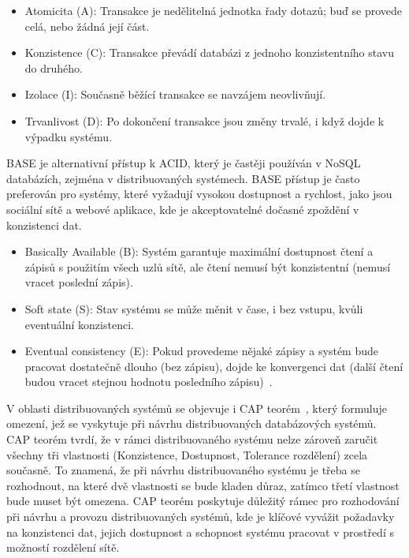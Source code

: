 \documentclass[czech,master,dept460,male,csharp,cpdeclaration]{diploma}
\begin{document}
	\begin{itemize}
		\item Atomicita (A): Transakce je nedělitelná jednotka řady dotazů; buď se provede celá, nebo žádná její část.
		\item Konzistence (C): Transakce převádí databázi z jednoho konzistentního stavu do druhého.
		\item Izolace (I): Současně běžící transakce se navzájem neovlivňují.
		\item Trvanlivost (D): Po dokončení transakce jsou změny trvalé, i když dojde k výpadku systému.
	\end{itemize}
	
	BASE je alternativní přístup k ACID, který je častěji používán v NoSQL databázích, zejména v distribuovaných systémech. BASE přístup je často preferován pro systémy, které vyžadují vysokou dostupnost a rychlost, jako jsou sociální sítě a webové aplikace, kde je akceptovatelné dočasné zpoždění v konzistenci dat.
	
	\begin{itemize}
		\item Basically Available (B): Systém garantuje maximální dostupnost čtení a zápisů s použitím všech uzlů sítě, ale čtení nemusí být konzistentní (nemusí vracet poslední zápis).
		\item Soft state (S): Stav systému se může měnit v čase, i bez vstupu, kvůli eventuální konzistenci.
		\item Eventual consistency (E): Pokud provedeme nějaké zápisy a systém bude pracovat dostatečně dlouho (bez zápisu), dojde ke konvergenci dat (další čtení budou vracet stejnou hodnotu posledního zápisu)~\cite{base-vsb}.
	\end{itemize}
	
	V oblasti distribuovaných systémů se objevuje i CAP teorém~\cite{cap-theorem}, který formuluje omezení, jež se vyskytuje při návrhu distribuovaných databázových systémů. CAP teorém tvrdí, že v rámci distribuovaného systému nelze zároveň zaručit všechny tři vlastnosti (Konzistence, Dostupnost, Tolerance rozdělení) zcela současně. To znamená, že při návrhu distribuovaného systému je třeba se rozhodnout, na které dvě vlastnosti se bude kladen důraz, zatímco třetí vlastnost bude muset být omezena. CAP teorém poskytuje důležitý rámec pro rozhodování při návrhu a provozu distribuovaných systémů, kde je klíčové vyvážit požadavky na konzistenci dat, jejich dostupnost a schopnost systému pracovat v prostředí s možností rozdělení sítě.
	
\end{document}
